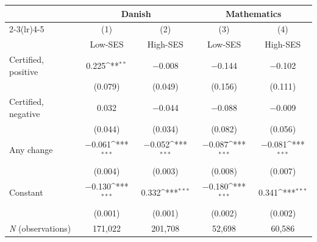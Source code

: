 {
\def\sym#1{\ifmmode^{#1}\else\(^{#1}\)\fi}
\begin{tabular*}{\hsize}{@{\hskip\tabcolsep\extracolsep\fill}l*{4}{c}}
\toprule
            &\multicolumn{2}{c}{Danish}                 &\multicolumn{2}{c}{Mathematics}            \\\cmidrule(lr){2-3}\cmidrule(lr){4-5}
            &\multicolumn{1}{c}{(1)}&\multicolumn{1}{c}{(2)}&\multicolumn{1}{c}{(3)}&\multicolumn{1}{c}{(4)}\\
            &\multicolumn{1}{c}{Low-SES}&\multicolumn{1}{c}{High-SES}&\multicolumn{1}{c}{Low-SES}&\multicolumn{1}{c}{High-SES}\\
\midrule
Certified, positive&       0.225\sym{**} &    $-$0.008         &    $-$0.144         &    $-$0.102         \\
            &     (0.079)         &     (0.049)         &     (0.156)         &     (0.111)         \\
Certified, negative&       0.032         &    $-$0.044         &    $-$0.088         &    $-$0.009         \\
            &     (0.044)         &     (0.034)         &     (0.082)         &     (0.056)         \\
Any change  &    $-$0.061\sym{***}&    $-$0.052\sym{***}&    $-$0.087\sym{***}&    $-$0.081\sym{***}\\
            &     (0.004)         &     (0.003)         &     (0.008)         &     (0.007)         \\
Constant    &    $-$0.130\sym{***}&       0.332\sym{***}&    $-$0.180\sym{***}&       0.341\sym{***}\\
            &     (0.001)         &     (0.001)         &     (0.002)         &     (0.002)         \\
\midrule
 \textit{N} (observations)&     171,022         &     201,708         &      52,698         &      60,586         \\
\bottomrule
\end{tabular*}
}
